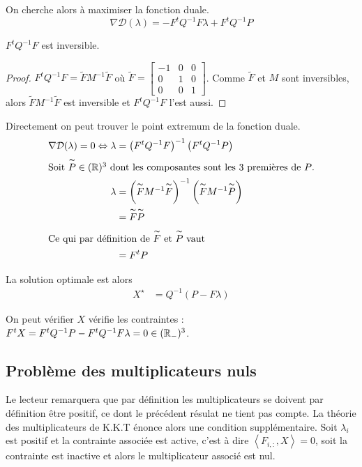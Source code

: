 On cherche alors à maximiser la fonction duale.
\begin{equation}
\nabla \mathcal D (\lambda) = -F^tQ^{-1}F\lambda + F^tQ^{-1}P
\end{equation}

\begin{prop}[Inversibilité de $F^tQ^{-1}F$]
  $F^tQ^{-1}F$ est inversible.
\end{prop}
\begin{proof}
$F^tQ^{-1}F = \tilde FM^{-1}\tilde F$ où $\tilde F = \begin{bmatrix}
-1 & 0 & 0 \\
0 & 1 & 0 \\
0 & 0 & 1
\end{bmatrix}$.  Comme $\tilde F$ et $M$ sont inversibles, alors $\tilde FM^{-1}\tilde F$ est inversible et $F^tQ^{-1}F$ l'est aussi.
\end{proof}

Directement on peut trouver le point extremum de la fonction duale.
\begin{align}
\nabla \mathcal D (\lambda) = 0 \Leftrightarrow \lambda &= \left(F^tQ^{-1}F\right)^{-1}\left(F^tQ^{-1}P\right)\\
\intertext{Soit $\overset{\thicksim}{P}\in (\mathbb R)^3$ dont les composantes sont les 3 premières de $P$.}
\lambda &  = \left(\overset{\thicksim}{F}M^{-1}\overset{\thicksim}{F}\right)^{-1}\left(\overset{\thicksim}{F}M^{-1}\overset{\thicksim}{P}\right) \\
& = \overset{\thicksim}{F}\overset{\thicksim}{P}\\
\intertext{Ce qui par définition de $\overset{\thicksim}{F}$ et $\overset{\thicksim}{P}$ vaut}
& = F^tP
\end{align}

La solution optimale est alors
\begin{align}
X^\star &= Q^{-1}\left(P- F\lambda\right)
\end{align}

On peut vérifier $X$ vérifie les contraintes : $ F^t X = F^t Q^{-1} P - F^tQ^{-1}F\lambda = 0 \in (\mathbb R_-)^3$.

\subsection{Problème des multiplicateurs nuls}


Le lecteur remarquera que par définition les multiplicateurs se doivent par définition être positif, ce dont le précédent résulat ne tient pas compte. La théorie des multiplicateurs de K.K.T énonce alors une condition supplémentaire. Soit $\lambda_i$ est positif et la contrainte associée est active, c'est à dire $\left<F_{i,:},X\right> = 0$, soit la contrainte est inactive et alors le multiplicateur associé est nul.


